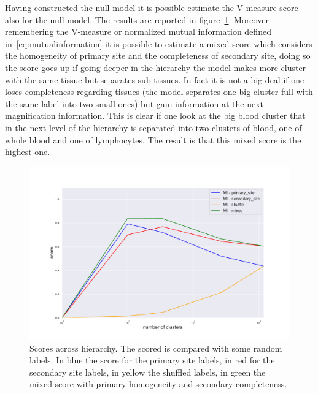 Having constructed the null model it is possible estimate the V-measure score also for the null model. The results are reported in figure~\ref{fig:topic/gtex/oversigma_10tissue/metric_scores_shuffle}. 
Moreover remembering the V-measure or normalized mutual information defined in~\ref{eq:mutualinformation} it is possible to estimate a mixed score which considers the homogeneity of primary site and the completeness of secondary site, doing so the score goes up if going deeper in the hierarchy the model makes more cluster with the same tissue but separates sub tissues. In fact it is not a big deal if one loses completeness regarding tissues (the model separates one big cluster full with the same label into two small ones) but gain information at the next magnification information. This is clear if one look at the big blood cluster that in the next level of the hierarchy is separated into two clusters of blood, one of whole blood and one of lymphocytes. The result is that this mixed score is the highest one.
\begin{figure}[htb!]
    \centering
    \includegraphics[width=0.9\linewidth]{pictures/topic/gtex/oversigma_10tissue/metric_scores_shuffle.pdf}
    \caption{Scores across hierarchy. The scored is compared with some random labels. In blue the score for the primary site labels, in red for the secondary site labels, in yellow the shuffled labels, in green the mixed score with primary homogeneity and secondary completeness.}
    \label{fig:topic/gtex/oversigma_10tissue/metric_scores_shuffle}
\end{figure}

\clearpage
